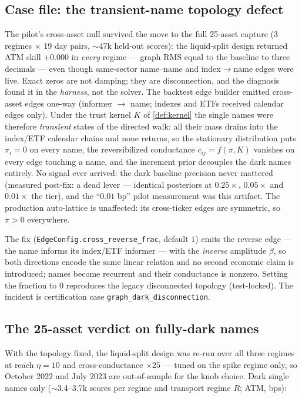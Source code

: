 \documentclass[11pt]{article}
\begin{document}
\subsection{Case file: the transient-name topology defect}
\label{sec:loo-casefile}

The pilot's cross-asset null survived the move to the full 25-asset capture
(3 regimes $\times$ 19 day pairs, $\sim$47k held-out scores): the liquid-split
design returned ATM skill $+0.000$ in \emph{every} regime --- graph RMS equal
to the baseline to three decimals --- even though same-sector name--name and
index$\to$name edges were live. Exact zeros are not damping; they are
disconnection, and the diagnosis found it in the \emph{harness}, not the
solver. The backtest edge builder emitted cross-asset edges one-way (informer
$\to$ name; indexes and ETFs received calendar edges only). Under the trust
kernel $K$ of \cref{def:kernel} the single names were therefore
\emph{transient} states of the directed walk: all their mass drains into the
index/ETF calendar chains and none returns, so the stationary distribution
puts $\pi_i=0$ on every name, the reversibilized conductance
$c_{ij}=f(\pi,K)$ vanishes on every edge touching a name, and the increment
prior decouples the dark names entirely. No signal ever arrived: the dark
baseline precision never mattered (measured post-fix: a dead lever ---
identical posteriors at $0.25\times$, $0.05\times$ and $0.01\times$ the tier),
and the ``$0.01$ bp'' pilot measurement was this artifact. The production
auto-lattice is unaffected: its cross-ticker edges are symmetric, so
$\pi>0$ everywhere.

The fix (\nolinkurl{EdgeConfig.cross_reverse_frac}, default $1$) emits the
reverse edge --- the name informs its index/ETF informer --- with the
\emph{inverse} amplitude $\beta$, so both directions encode the same linear
relation and no second economic claim is introduced; names become recurrent
and their conductance is nonzero. Setting the fraction to $0$ reproduces the
legacy disconnected topology (test-locked). The incident is certification
case \texttt{graph\_dark\_disconnection}.

\subsection{The 25-asset verdict on fully-dark names}
\label{sec:loo-25}

With the topology fixed, the liquid-split design was re-run over all three
regimes at reach $\eta=10$ and cross-conductance $\times25$ --- tuned on the
spike regime only, so October 2022 and July 2023 are out-of-sample for the
knob choice. Dark single names only ($\sim$3.4--3.7k scores per regime and
transport regime $R$; ATM, bps):
\end{document}
